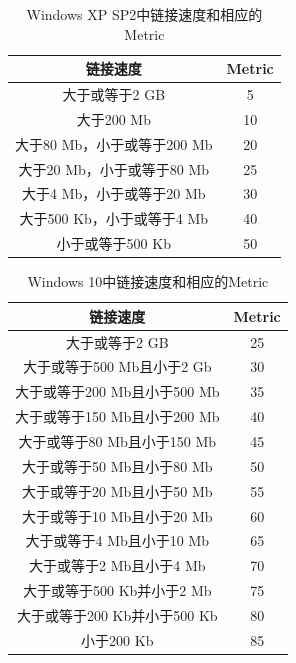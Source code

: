 \documentclass[11pt]{article}
\begin{document}
\begin{table}[H]
    \begin{center}
    \begin{tabular}{cc}
        \toprule
        链接速度 & Metric\\
        \midrule
        大于或等于2 GB & 5  \\
        大于200 Mb & 10  \\
        大于80 Mb，小于或等于200 Mb & 20 \\
        大于20 Mb，小于或等于80 Mb & 25 \\
        大于4 Mb，小于或等于20 Mb & 30 \\
        大于500 Kb，小于或等于4 Mb & 40\\
        小于或等于500 Kb & 50\\
        \bottomrule
    \end{tabular}
    \caption{Windows XP SP2中链接速度和相应的Metric}
    \end{center}
\end{table}
\begin{table}[H]
    \begin{center}
    \begin{tabular}{cc}
        \toprule
        链接速度 & Metric\\
        \midrule
        大于或等于2 GB & 25  \\
        大于或等于500 Mb且小于2 Gb & 30  \\
        大于或等于200 Mb且小于500 Mb & 35 \\
        大于或等于150 Mb且小于200 Mb & 40 \\
        大于或等于80 Mb且小于150 Mb & 45 \\
        大于或等于50 Mb且小于80 Mb & 50\\
        大于或等于20 Mb且小于50 Mb & 55\\
        大于或等于10 Mb且小于20 Mb & 60\\
        大于或等于4 Mb且小于10 Mb & 65\\
        大于或等于2 Mb且小于4 Mb & 70\\
        大于或等于500 Kb并小于2 Mb & 75\\
        大于或等于200 Kb并小于500 Kb & 80\\
        小于200 Kb & 85\\
        \bottomrule
    \end{tabular}
    \caption{Windows 10中链接速度和相应的Metric}
    \end{center}
\end{table}
\end{document}
